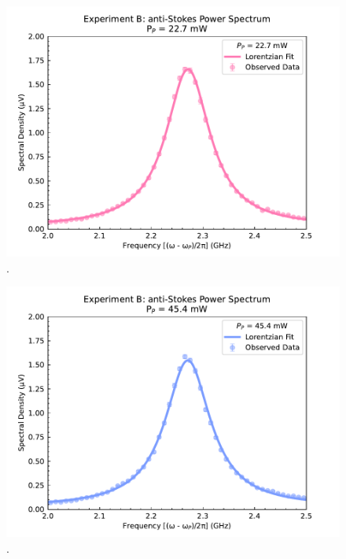 \begin{figure}[t!]
  \centering
  \includegraphics[width=\textwidth]{figs/3-Cooling/P-P anti-Stokes Fit - 55mW.pdf}
  \caption{.}
  \label{fig:Cooling:P-P anti-Stokes Fit - 55mW}
\end{figure}

\begin{figure}[t!]
  \centering
  \includegraphics[width=\textwidth]{figs/3-Cooling/P-P anti-Stokes Fit - 110mW.pdf}
  \caption{.}
  \label{fig:Cooling:P-P anti-Stokes Fit - 110mW}
\end{figure}


